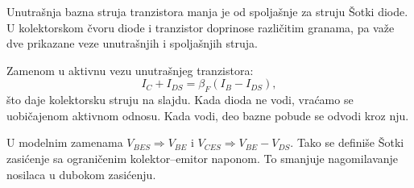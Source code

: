 Unutrašnja bazna struja tranzistora manja je od spoljašnje za struju Šotki diode. U kolektorskom čvoru diode i tranzistor doprinose različitim granama, pa važe dve prikazane veze unutrašnjih i spoljašnjih struja.

Zamenom u aktivnu vezu unutrašnjeg tranzistora:
\[I_C+I_{DS}=\beta_F(I_B-I_{DS}),\]
što daje kolektorsku struju na slajdu. Kada dioda ne vodi, vraćamo se uobičajenom aktivnom odnosu. Kada vodi, deo bazne pobude se odvodi kroz nju.

U modelnim zamenama $V_{BES}\Rightarrow V_{BE}$ i $V_{CES}\Rightarrow V_{BE}-V_{DS}$. Tako se definiše Šotki zasićenje sa ograničenim kolektor–emitor naponom. To smanjuje nagomilavanje nosilaca u dubokom zasićenju.
